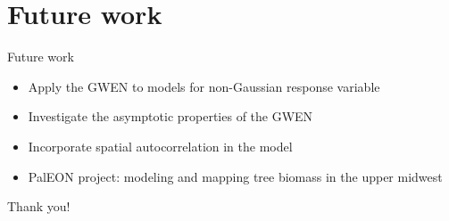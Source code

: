 \documentclass[12pt,t,handout]{beamer}
\begin{document}
\section{Future work}


\begin{frame}{Future work}
\begin{itemize}
  \item Apply the GWEN to models for non-Gaussian response variable
  \item Investigate the asymptotic properties of the GWEN
  \item Incorporate spatial autocorrelation in the model
  \item PalEON project: modeling and mapping tree biomass in the upper midwest
\end{itemize}
\end{frame}



\begin{frame}{Thank you!}

\end{frame}
\end{document}
